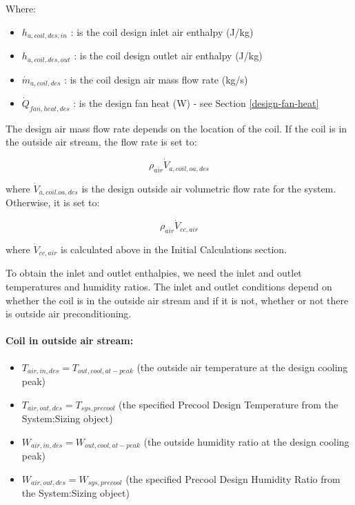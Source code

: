 Where:

\begin{itemize}
\item
  \(h_{a,coil,des,in}\) : is the coil design inlet air enthalpy (J/kg)
\item
  \(h_{a,coil,des,out}\) : is the coil design outlet air enthalpy (J/kg)
\item
  \(\dot{m}_{a,coil,des}\) : is the coil design air mass flow rate (kg/s)
\item
  \(\dot{Q}_{fan,heat,des}\) : is the design fan heat (W) - see Section \ref{design-fan-heat}
\end{itemize}

The design air mass flow rate depends on the location of the coil. If the coil is in the outside air stream, the flow rate is set to:

\begin{equation}
  \rho_{air}\dot{V}_{a,coil,oa,des}
\end{equation}

where \(\dot{V}_{a,coil.oa,des}\) is the design outside air volumetric flow rate for the system. Otherwise, it is set to:

\begin{equation}
\rho_{air}\dot{V}_{cc,air}
\end{equation}

where \(\dot{V}_{cc,air}\) is calculated above in the Initial Calculations section.

To obtain the inlet and outlet enthalpies, we need the inlet and outlet temperatures and humidity ratios. The inlet and outlet conditions depend on whether the coil is in the outside air stream and if it is not, whether or not there is outside air preconditioning.

\paragraph{\textbf{Coil in outside air stream}:}\label{coil-in-outside-air-stream}

\begin{itemize}
\item
  \(T_{air,in,des} = T_{out,cool,at-peak}\) (the outside air temperature at the design cooling peak)
\item
  \(T_{air,out,des} = T_{sys,precool}\) (the specified Precool Design Temperature from the System:Sizing object)
\item
  \(W_{air,in,des} = W_{out,cool,at-peak}\) (the outside humidity ratio at the design cooling peak)
\item
  \(W_{air,out,des} = W_{sys,precool}\) (the specified Precool Design Humidity Ratio from the System:Sizing object)
\end{itemize}

